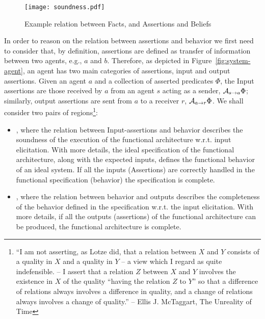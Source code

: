 \begin{figure}[t]
	\centering
	\texttt{[image: soundness.pdf]}
	\caption{Example relation between Facts, and Assertions and Beliefs}
	\label{fig:soundness}
\end{figure}

In order to reason on the relation between assertions and behavior we first
need to consider that, by definition, assertions are defined as transfer of
information between two agents, e.g., $a$ and $b$.  Therefore, as depicted in
Figure~\ref{fig:system-agent}, an agent has two main categories of assertions,
input and output assertions.  Given an agent $a$ and a collection of asserted
predicates $\Phi$, the Input assertions are those received by $a$ from an agent
$s$ acting as a sender, $\mathcal{A}_{s\rightarrow a}\Phi$; similarly, output assertions
are sent from $a$ to a receiver $r$, $\mathcal{A}_{a\rightarrow r}\Phi$. We shall consider
two pairs of regions\footnote{``I am not asserting, as Lotze did, that a relation between $X$ and $Y$
consists of a quality in $X$ and a quality in $Y$ -- a view which I regard as
quite indefensible. -- I assert that a relation $Z$ between $X$ and $Y$ involves
the existence in $X$ of the quality ``having the relation $Z$ to $Y$'' so that
a difference of relations always involves a difference in quality, and a
change of relations always involves a change of quality.'' --  Ellis J. McTaggart, The Unreality of Time\autocite{Mctaggart1908unreality}}: 
\begin{itemize}
	\item {},
		where the relation between Input-assertions and behavior
		describes the soundness of the execution of the functional
		architecture w.r.t. input elicitation. With more details, the
		ideal specification of the functional architecture, along with
		the expected inputs, defines the functional behavior of an
		ideal system.  If all the inputs (Assertions) are correctly
		handled in the functional specification (behavior) the
		specification is complete. 

	\item {},
		where the relation between behavior and outputs describes the
		completeness of the behavior defined in the specification
		w.r.t. the input elicitation.  With more details, if all the
		outputs (assertions) of the functional architecture can be
		produced, the functional architecture is complete.
\end{itemize}


